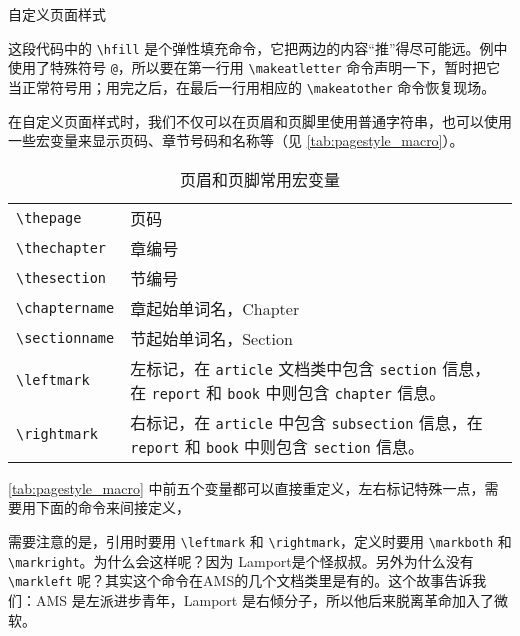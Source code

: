 \begin{example}[htbp]
\caption{自定义页面样式}
\label{exa:def_pagestyle}
\end{example}

这段代码中的 \verb|\hfill| 是个弹性填充命令，它把两边的内容“推”得尽可能远。例中使用了特殊符号 \texttt{@}，所以要在第一行用 \verb|\makeatletter| 命令声明一下，暂时把它当正常符号用；用完之后，在最后一行用相应的 \verb|\makeatother| 命令恢复现场。

在自定义页面样式时，我们不仅可以在页眉和页脚里使用普通字符串，也可以使用一些宏变量来显示页码、章节号码和名称等（见 \autoref{tab:pagestyle_macro}）。

\begin{table}[!h]
\centering
\caption{页眉和页脚常用宏变量}
\label{tab:pagestyle_macro}
\begin{tabularx}{350pt}{lX}
  \toprule
  \verb|\thepage| & 页码 \\
  \verb|\thechapter| & 章编号 \\
  \verb|\thesection| & 节编号 \\
  \verb|\chaptername| & 章起始单词名，Chapter \\
  \verb|\sectionname| & 节起始单词名，Section \\
  \verb|\leftmark| & 左标记，在 \texttt{article} 文档类中包含 \texttt{section} 信息，在 \texttt{report} 和 \texttt{book} 中则包含 \texttt{chapter} 信息。\\
  \verb|\rightmark| & 右标记，在 \texttt{article} 中包含 \texttt{subsection} 信息，在 \texttt{report} 和 \texttt{book} 中则包含 \texttt{section} 信息。\\
  \bottomrule
\end{tabularx}
\end{table}

\autoref{tab:pagestyle_macro} 中前五个变量都可以直接重定义，左右标记特殊一点，需要用下面的命令来间接定义，

\begin{Code}[numbers=none]
\end{Code}

需要注意的是，引用时要用 \verb|\leftmark| 和 \verb|\rightmark|，定义时要用 \verb|\markboth| 和 \verb|\markright|。为什么会这样呢？因为 Lamport\indexLamport 是个怪叔叔。另外为什么没有 \verb|\markleft| 呢？其实这个命令在AMS的几个文档类里是有的。这个故事告诉我们：AMS 是左派进步青年，Lamport 是右倾分子，所以他后来脱离革命加入了微软。

